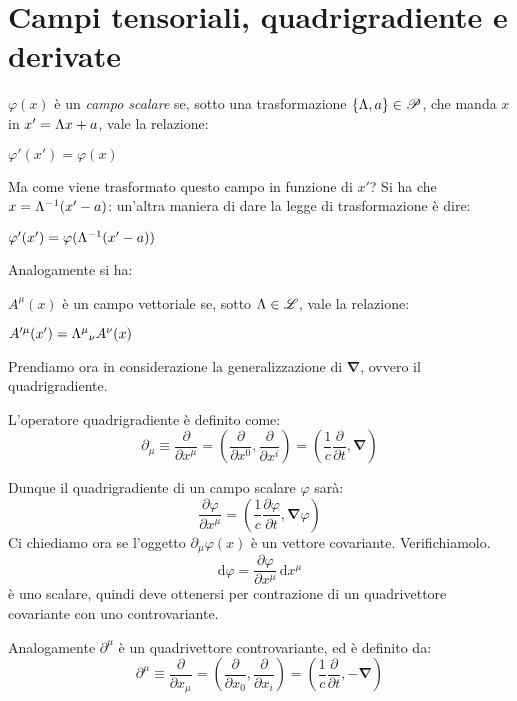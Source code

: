 \section{ Campi tensoriali, quadrigradiente e derivate}
\begin{definizione}
$\varphi(x)$ \`e un \emph{campo scalare} se, sotto una
trasformazione $\{\Lambda,a\}\in\mathscr{P}$, che manda $x$ in $x'=\Lambda x +
a$, vale la relazione:
\begin{center}
$\varphi'(x')=\varphi(x)$
\end{center}
\end{definizione}
Ma come viene trasformato questo campo in funzione di $x'$? Si ha
che $x=\Lambda^{-1}(x'-a)$: un'altra maniera di dare la
legge di trasformazione \`e dire:
\begin{center}
 $\varphi'(x')=\varphi(\Lambda^{-1}(x'-a))$
\end{center}
Analogamente si ha:
\begin{definizione}
$A^{\mu}(x)$ \`e un campo vettoriale se, 
sotto $\Lambda\in\mathscr{L}$,
vale la relazione:
\begin{center}
$A'^{\mu}(x')=\Lambda^{\mu}{}_{\nu}A^{\nu}(x)$
\end{center}
\end{definizione}
Prendiamo ora in considerazione la generalizzazione di
$\mathbf{\nabla}$, ovvero il quadrigradiente.
\begin{definizione}[Quadrigradiente]
L'operatore
quadrigradiente \`e definito come:
\begin{equation}
 \partial_{\mu} \equiv \frac{\partial}{\partial x^{\mu}} = 
  \left(
   \frac{\partial}{\partial x^0}, 
   \frac{\partial}{\partial x^i}
  \right)
  =\left(
    \frac{1}{c}\frac{\partial}{\partial t},
    \mathbf{\nabla}
   \right)
\end{equation}
\end{definizione}
Dunque il quadrigradiente di un campo scalare $\varphi$ sar\`a:
\begin{equation}
 \frac{\partial \varphi}{\partial x^{\mu}} = 
  \left(
   \frac{1}{c}\frac{\partial \varphi}{\partial t},
   \mathbf{\nabla}\varphi
  \right)
\end{equation}
Ci chiediamo ora se l'oggetto $\partial_{\mu}\varphi(x)$ \`e un
vettore covariante. Verifichiamolo.
\begin{equation}
 \mathrm{d}\varphi=\frac{\partial \varphi}{\partial x^{\mu}} \, 
  \mathrm{d}x^{\mu}
\end{equation}
\`e uno scalare, quindi deve ottenersi per contrazione di un
quadrivettore covariante con uno controvariante.
\begin{definizione}
Analogamente
$\partial^{\mu}$ \`e un quadrivettore controvariante, ed \`e
definito da:
\begin{equation}
 \partial^{\mu} \equiv \frac{\partial}{\partial x_{\mu}} = 
  \left(
   \frac{\partial}{\partial x_0},
   \frac{\partial}{\partial x_i}
  \right) = 
  \left(
   \frac{1}{c}\frac{\partial}{\partial t},
   -\mathbf{\nabla}
  \right)
\end{equation}
\end{definizione}

